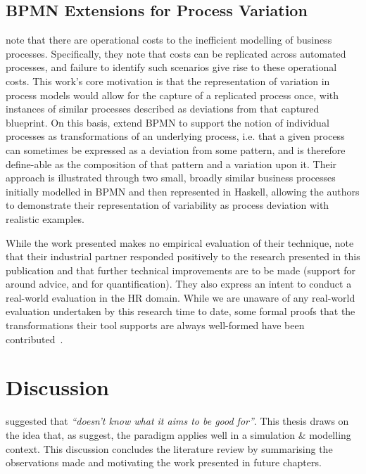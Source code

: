 \subsection{BPMN Extensions for Process Variation}

\citeauthor{Machado_2011} note that there are operational costs to the
inefficient modelling of business processes. Specifically, they note that costs
can be replicated across automated processes, and failure to identify such
scenarios give rise to these operational costs. This work's core motivation is
that the representation of variation in process models would allow for the
capture of a replicated process once, with instances of similar processes
described as deviations from that captured blueprint. On this basis,
\citeauthor{Machado_2011} extend BPMN to support the notion of individual
processes as transformations of an underlying process, i.e. that a given process
can sometimes be expressed as a deviation from some pattern, and is therefore
define-able as the composition of that pattern and a variation upon it. Their
approach is illustrated through two small, broadly similar business processes
initially modelled in BPMN and then represented in Haskell, allowing the authors
to demonstrate their representation of variability as process deviation with
realistic examples.

While the work presented makes no empirical evaluation of their technique,
\citeauthor{Machado_2011} note that their industrial partner responded
positively to the research presented in this publication and that further
technical improvements are to be made (support for around advice, and for
quantification). They also express an intent to conduct a real-world evaluation
in the HR domain. While we are unaware of any real-world evaluation undertaken
by this research time to date, some formal proofs that the transformations their
tool supports are always well-formed have been
contributed~\cite{machado2012formal}.



\section{Discussion}
\label{sec:lit_discussion}

\citet{steimann06paradoxical} suggested that \aop \emph{``doesn't know what it
aims to be good for''}. This thesis draws on the idea that, as
\citet{gulyas1999use} suggest, the paradigm applies well in a simulation \&
modelling context. This discussion concludes the literature review by
summarising the observations made and motivating the work presented in future
chapters.

